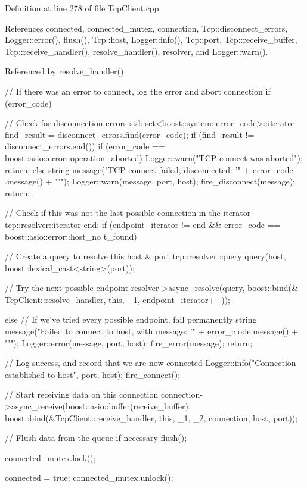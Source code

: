 Definition at line 278 of file TcpClient.cpp.



References connected, connected\_\-mutex, connection, Tcp::disconnect\_\-errors, Logger::error(), flush(), Tcp::host, Logger::info(), Tcp::port, Tcp::receive\_\-buffer, Tcp::receive\_\-handler(), resolve\_\-handler(), resolver, and Logger::warn().



Referenced by resolve\_\-handler().


\begin{DoxyCode}
{
    // If there was an error to connect, log the error and abort connection
    if (error_code)
    {
        // Check for disconnection errors
        std::set<boost::system::error_code>::iterator find_result = 
      disconnect_errors.find(error_code);
        if (find_result != disconnect_errors.end())
        {
            if (error_code == boost::asio::error::operation_aborted)
            {
                Logger::warn("TCP connect was aborted");
                return;
            }
            else
            {
                string message("TCP connect failed, disconnected: '" + error_code
      .message() + "'");
                Logger::warn(message, port, host);
                fire_disconnect(message);
                return;
            }
        }

        // Check if this was not the last possible connection in the iterator
        tcp::resolver::iterator end;
        if (endpoint_iterator != end && error_code == boost::asio::error::host_no
      t_found)
        {
            // Create a query to resolve this host & port
            tcp::resolver::query query(host, boost::lexical_cast<string>(port));

            // Try the next possible endpoint
            resolver->async_resolve(query, boost::bind(&
      TcpClient::resolve_handler, this, _1, endpoint_iterator++));
        }
        else
        {
            // If we've tried every possible endpoint, fail permanently
            string message("Failed to connect to host, with message: '" + error_c
      ode.message() + "'");
            Logger::error(message, port, host);
            fire_error(message);
            return;
        }
    }

    // Log success, and record that we are now connected
    Logger::info("Connection established to host", port, host);
    fire_connect();

    // Start receiving data on this connection
    connection->async_receive(boost::asio::buffer(receive_buffer),
            boost::bind(&TcpClient::receive_handler, this, _1, _2, connection, 
      host, port));

    // Flush data from the queue if necessary
    flush();

    connected_mutex.lock();

    connected = true;
    connected_mutex.unlock();
}
\end{DoxyCode}
